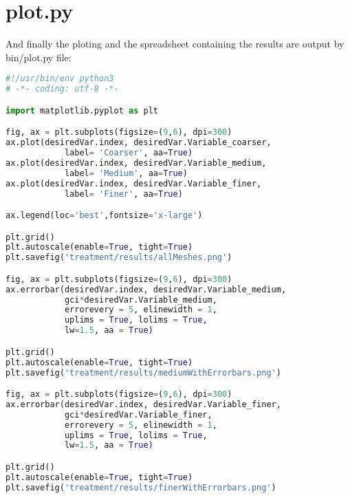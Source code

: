 \section{plot.py}
And finally the ploting and the spreadsheet containing the results are output by bin/plot.py file: 
\begin{lstlisting}[language=python]
#!/usr/bin/env python3
# -*- coding: utf-8 -*-

import matplotlib.pyplot as plt

fig, ax = plt.subplots(figsize=(9,6), dpi=300)
ax.plot(desiredVar.index, desiredVar.Variable_coarser,
            label= 'Coarser', aa=True)
ax.plot(desiredVar.index, desiredVar.Variable_medium,
            label= 'Medium', aa=True)
ax.plot(desiredVar.index, desiredVar.Variable_finer,
            label= 'Finer', aa=True)

ax.legend(loc='best',fontsize='x-large')

plt.grid()
plt.autoscale(enable=True, tight=True)
plt.savefig('treatment/results/allMeshes.png')

fig, ax = plt.subplots(figsize=(9,6), dpi=300)
ax.errorbar(desiredVar.index, desiredVar.Variable_medium,
            gci*desiredVar.Variable_medium,
            errorevery = 5, elinewidth = 1,
            uplims = True, lolims = True, 
            lw=1.5, aa = True)

plt.grid()
plt.autoscale(enable=True, tight=True)
plt.savefig('treatment/results/mediumWithErrorbars.png')

fig, ax = plt.subplots(figsize=(9,6), dpi=300)
ax.errorbar(desiredVar.index, desiredVar.Variable_finer,
            gci*desiredVar.Variable_finer,
            errorevery = 5, elinewidth = 1,
            uplims = True, lolims = True, 
            lw=1.5, aa = True)

plt.grid()
plt.autoscale(enable=True, tight=True)
plt.savefig('treatment/results/finerWithErrorbars.png')
\end{lstlisting}